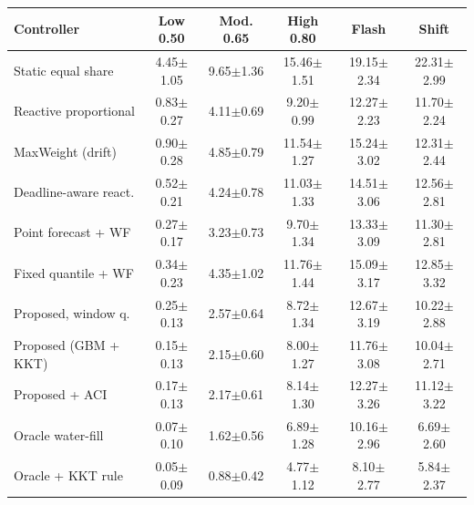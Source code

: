 \begin{tabular}{lccccc}
\hline
Controller & Low 0.50 & Mod. 0.65 & High 0.80 & Flash & Shift \\
\hline
Static equal share & 4.45$\pm$1.05 & 9.65$\pm$1.36 & 15.46$\pm$1.51 & 19.15$\pm$2.34 & 22.31$\pm$2.99 \\
Reactive proportional & 0.83$\pm$0.27 & 4.11$\pm$0.69 & 9.20$\pm$0.99 & 12.27$\pm$2.23 & 11.70$\pm$2.24 \\
MaxWeight (drift) & 0.90$\pm$0.28 & 4.85$\pm$0.79 & 11.54$\pm$1.27 & 15.24$\pm$3.02 & 12.31$\pm$2.44 \\
Deadline-aware react. & 0.52$\pm$0.21 & 4.24$\pm$0.78 & 11.03$\pm$1.33 & 14.51$\pm$3.06 & 12.56$\pm$2.81 \\
Point forecast + WF & 0.27$\pm$0.17 & 3.23$\pm$0.73 & 9.70$\pm$1.34 & 13.33$\pm$3.09 & 11.30$\pm$2.81 \\
Fixed quantile + WF & 0.34$\pm$0.23 & 4.35$\pm$1.02 & 11.76$\pm$1.44 & 15.09$\pm$3.17 & 12.85$\pm$3.32 \\
Proposed, window q. & 0.25$\pm$0.13 & 2.57$\pm$0.64 & 8.72$\pm$1.34 & 12.67$\pm$3.19 & 10.22$\pm$2.88 \\
Proposed (GBM + KKT) & 0.15$\pm$0.13 & 2.15$\pm$0.60 & 8.00$\pm$1.27 & 11.76$\pm$3.08 & 10.04$\pm$2.71 \\
Proposed + ACI & 0.17$\pm$0.13 & 2.17$\pm$0.61 & 8.14$\pm$1.30 & 12.27$\pm$3.26 & 11.12$\pm$3.22 \\
\hline
Oracle water-fill & 0.07$\pm$0.10 & 1.62$\pm$0.56 & 6.89$\pm$1.28 & 10.16$\pm$2.96 & 6.69$\pm$2.60 \\
Oracle + KKT rule & 0.05$\pm$0.09 & 0.88$\pm$0.42 & 4.77$\pm$1.12 & 8.10$\pm$2.77 & 5.84$\pm$2.37 \\
\hline
\end{tabular}
